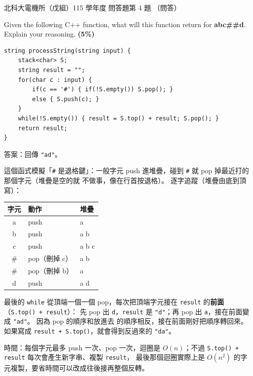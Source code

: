 \begin{pastexam}[label={px:ntut-115-ee-ds-24}]{北科大電機所（戊組）115 學年度 問答題第 4 題}
（問答）

Given the following C++ function, what will this function return for \textbf{abc\#\#d}. Explain your
reasoning. \textbf{(5\%)}
\begin{verbatim}
string processString(string input) {
    stack<char> S;
    string result = "";
    for(char c : input) {
        if(c == '#') { if(!S.empty()) S.pop(); }
        else { S.push(c); }
    }
    while(!S.empty()) { result = S.top() + result; S.pop(); }
    return result;
}
\end{verbatim}
\end{pastexam}

\begin{pastsoln}
答案：回傳 \texttt{"ad"}。

這個函式模擬「\texttt{\#} 是退格鍵」：一般字元 push 進堆疊，碰到 \texttt{\#} 就 pop 掉最近打的那個字元（堆疊是空的就
不做事，像在行首按退格）。 逐字追蹤（堆疊由底到頂寫）：
\begin{center}
\begin{tabular}{cll}
\toprule
字元 & 動作 & 堆疊 \\
\midrule
a & push & a \\
b & push & a b \\
c & push & a b c \\
\# & pop（刪掉 c） & a b \\
\# & pop（刪掉 b） & a \\
d & push & a d \\
\bottomrule
\end{tabular}
\end{center}
最後的 \texttt{while} 從頂端一個一個 pop，每次把頂端字元接在 \texttt{result} 的\textbf{前面}（\texttt{S.top() + result}）：
先 pop 出 \texttt{d}，\texttt{result} 是 \texttt{"d"}；再 pop 出 \texttt{a}，接在前面變成 \texttt{"ad"}。 因為 pop 的順序和放進去
的順序相反，接在前面剛好把順序轉回來。 如果寫成 \texttt{result + S.top()}，就會得到反過來的 \texttt{"da"}。

時間：每個字元最多 push 一次、pop 一次，迴圈是 $O(n)$；不過 \texttt{S.top() + result} 每次會產生新字串、複製 \texttt{result}，
最後那個迴圈實際上是 $O(n^2)$ 的字元複製，要省時間可以改成往後接再整個反轉。
\end{pastsoln}

